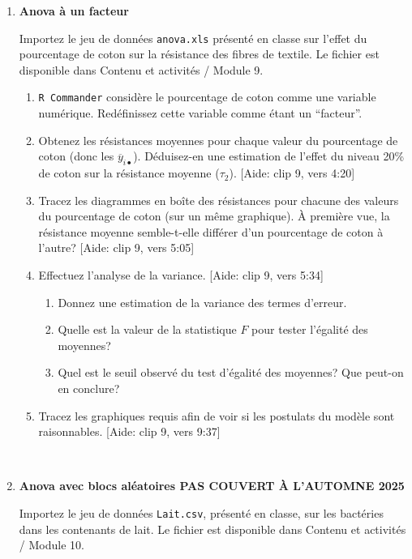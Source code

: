 \documentclass[12pt]{article}
\begin{document}
\begin{enumerate}
\item {\bf Anova à un facteur}

Importez le jeu de données {\tt anova.xls} présenté en classe sur l'effet du pourcentage de coton sur la résistance des fibres de textile. Le fichier est disponible dans Contenu et activités / Module 9.
\begin{enumerate}
\item[(a)] {\tt R Commander} considère le pourcentage de coton comme une variable numérique. Redéfinissez cette variable comme étant un ``facteur''.
\item[(b)] Obtenez les résistances moyennes pour chaque valeur du pourcentage de coton (donc les $\overline{y}_{i\bullet}$). Déduisez-en une estimation de l'effet du niveau 20\% de coton sur la résistance moyenne ($\tau_2$). [Aide: clip 9, vers 4\!\!:20]
\item[(c)] Tracez les diagrammes en boîte des résistances pour chacune des valeurs du pourcentage de coton (sur un même graphique). À première vue, la résistance moyenne semble-t-elle différer d'un pourcentage de coton à l'autre? [Aide: clip 9, vers 5\!\!:05]
\item[(d)] Effectuez l'analyse de la variance. [Aide: clip 9, vers 5\!\!:34]
\begin{enumerate}
\item[(i)] Donnez une estimation de la variance des termes d'erreur.
\item[(ii)] Quelle est la valeur de la statistique $F$ pour tester l'égalité des moyennes?
\item[(iii)] Quel est le seuil observé du test d'égalité des moyennes? Que peut-on en conclure?
\end{enumerate}
\item[(e)] Tracez les graphiques requis afin de voir si les postulats du modèle sont raisonnables. [Aide: clip 9, vers 9\!\!:37]
\end{enumerate}


\newpage

{\ }
\vspace{0.05in}


\item {\bf Anova avec blocs aléatoires PAS COUVERT À L'AUTOMNE 2025}

Importez le jeu de données {\tt Lait.csv}, présenté en classe, sur les bactéries dans les contenants de lait. Le fichier est disponible dans Contenu et activités / Module 10.
    

\end{enumerate}
\end{document}
